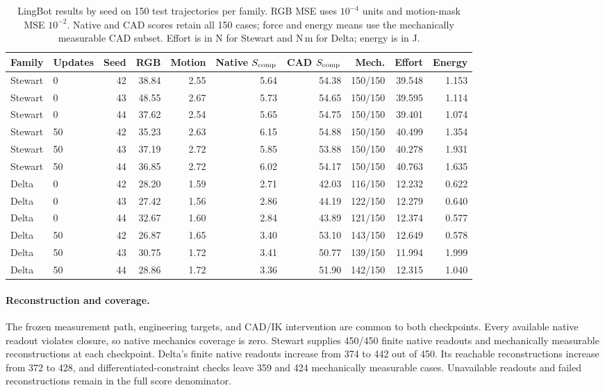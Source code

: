 \begin{table}[t]
\caption{LingBot results by seed on 150 test trajectories per family. RGB MSE uses $10^{-4}$ units and motion-mask MSE $10^{-2}$. Native and CAD scores retain all 150 cases; force and energy means use the mechanically measurable CAD subset. Effort is in N for Stewart and N\,m for Delta; energy is in J.}
\label{app:lingbot-seeds}
\centering\small
\setlength{\tabcolsep}{4pt}
\begin{tabular}{llrrrrrrrr}
\toprule
Family & Updates & Seed & RGB & Motion & Native $S_{\rm comp}$ & CAD $S_{\rm comp}$ & Mech. & Effort & Energy\\
\midrule
Stewart & 0 & 42 & 38.84 & 2.55 & 5.64 & 54.38 & 150/150 & 39.548 & 1.153 \\
Stewart & 0 & 43 & 48.55 & 2.67 & 5.73 & 54.65 & 150/150 & 39.595 & 1.114 \\
Stewart & 0 & 44 & 37.62 & 2.54 & 5.65 & 54.75 & 150/150 & 39.401 & 1.074 \\
Stewart & 50 & 42 & 35.23 & 2.63 & 6.15 & 54.88 & 150/150 & 40.499 & 1.354 \\
Stewart & 50 & 43 & 37.19 & 2.72 & 5.85 & 53.88 & 150/150 & 40.278 & 1.931 \\
Stewart & 50 & 44 & 36.85 & 2.72 & 6.02 & 54.17 & 150/150 & 40.763 & 1.635 \\
Delta & 0 & 42 & 28.20 & 1.59 & 2.71 & 42.03 & 116/150 & 12.232 & 0.622 \\
Delta & 0 & 43 & 27.42 & 1.56 & 2.86 & 44.19 & 122/150 & 12.279 & 0.640 \\
Delta & 0 & 44 & 32.67 & 1.60 & 2.84 & 43.89 & 121/150 & 12.374 & 0.577 \\
Delta & 50 & 42 & 26.87 & 1.65 & 3.40 & 53.10 & 143/150 & 12.649 & 0.578 \\
Delta & 50 & 43 & 30.75 & 1.72 & 3.41 & 50.77 & 139/150 & 11.994 & 1.999 \\
Delta & 50 & 44 & 28.86 & 1.72 & 3.36 & 51.90 & 142/150 & 12.315 & 1.040 \\
\bottomrule
\end{tabular}
\end{table}

\paragraph{Reconstruction and coverage.}
The frozen measurement path, engineering targets, and CAD/IK intervention are common to both checkpoints. Every available native readout violates closure, so native mechanics coverage is zero. Stewart supplies 450/450 finite native readouts and mechanically measurable reconstructions at each checkpoint. Delta's finite native readouts increase from 374 to 442 out of 450. Its reachable reconstructions increase from 372 to 428, and differentiated-constraint checks leave 359 and 424 mechanically measurable cases. Unavailable readouts and failed reconstructions remain in the full score denominator.

